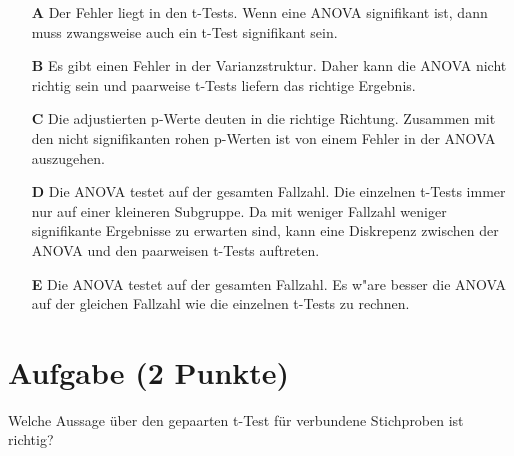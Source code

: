 \documentclass[a4paper, 10pt]{scrartcl}\usepackage[]{graphicx}\usepackage[]{xcolor}
\begin{document}
\begin{enumerate}
\item [\textbf{A} \msquare] Der Fehler liegt in den t-Tests. Wenn eine ANOVA signifikant ist, dann muss zwangsweise auch ein t-Test signifikant sein.
\item [\textbf{B} \msquare] Es gibt einen Fehler in der Varianzstruktur. Daher kann die ANOVA nicht richtig sein und paarweise t-Tests liefern das richtige Ergebnis.
\item [\textbf{C} \msquare] Die adjustierten p-Werte deuten in die richtige Richtung. Zusammen mit den nicht signifikanten rohen p-Werten ist von einem Fehler in der ANOVA auszugehen.
\item [\textbf{D} \msquare] Die ANOVA testet auf der gesamten Fallzahl. Die einzelnen t-Tests immer nur auf einer kleineren Subgruppe. Da mit weniger Fallzahl weniger signifikante Ergebnisse zu erwarten sind, kann eine Diskrepenz zwischen der ANOVA und den paarweisen t-Tests auftreten.
\item [\textbf{E} \msquare] Die ANOVA testet auf der gesamten Fallzahl. Es w{"a}re besser die ANOVA auf der gleichen Fallzahl wie die einzelnen t-Tests zu rechnen.
\end{enumerate} 

\section{Aufgabe \hfill (2 Punkte)}

Welche Aussage {\"u}ber den gepaarten t-Test f{\"u}r verbundene Stichproben ist richtig?
\end{document}
